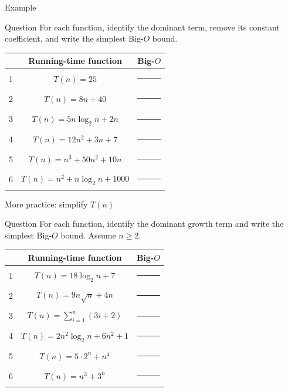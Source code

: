 \documentclass[aspectratio=169]{beamer}
\begin{document}
\begin{frame}{Example}
  \begin{block}{Question}
    For each function, identify the dominant term, remove its
    constant coefficient, and write the simplest Big-$O$ bound.
  \end{block}
  \begin{center}
    \renewcommand{\arraystretch}{1.12}
    \begin{tabular}{c|c|c}
      \toprule
      & \textbf{Running-time function} & \textbf{Big-$O$} \\
      \midrule
      1 & $T(n)=25$ & \rule{2.2cm}{0.4pt} \\
      2 & $T(n)=8n+40$ & \rule{2.2cm}{0.4pt} \\
      3 & $T(n)=5n\log_2 n+2n$ & \rule{2.2cm}{0.4pt} \\
      4 & $T(n)=12n^2+3n+7$ & \rule{2.2cm}{0.4pt} \\
      5 & $T(n)=n^3+50n^2+10n$ & \rule{2.2cm}{0.4pt} \\
      6 & $T(n)=n^2+n\log_2 n+1000$ & \rule{2.2cm}{0.4pt} \\
      \bottomrule
    \end{tabular}
  \end{center}
\end{frame}


\begin{frame}{More practice: simplify $T(n)$}
  \small
  \begin{block}{Question}
    For each function, identify the dominant growth term and write the
    simplest Big-$O$ bound. Assume $n\ge2$.
  \end{block}
  \begin{center}
    \renewcommand{\arraystretch}{1.18}
    \begin{tabular}{c|c|c}
      \toprule
      & \textbf{Running-time function} & \textbf{Big-$O$} \\
      \midrule
      1 & $T(n)=18\log_2 n+7$ & \rule{2.2cm}{0.4pt} \\
      2 & $T(n)=9n\sqrt n+4n$ & \rule{2.2cm}{0.4pt} \\
      3 & $T(n)=\displaystyle\sum_{i=1}^{n}(3i+2)$ & \rule{2.2cm}{0.4pt} \\
      4 & $T(n)=2n^2\log_2 n+6n^2+1$ & \rule{2.2cm}{0.4pt} \\
      5 & $T(n)=5\cdot2^n+n^4$ & \rule{2.2cm}{0.4pt} \\
      6 & $T(n)=n^3+3^n$ & \rule{2.2cm}{0.4pt} \\
      \bottomrule
    \end{tabular}
  \end{center}
\end{frame}
\end{document}
